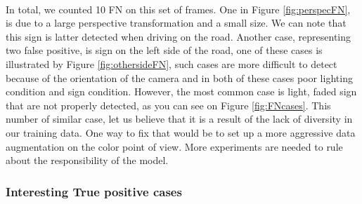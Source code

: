 \paragraph{}
In total, we counted 10 FN on this set of frames. One in Figure \ref{fig:perspecFN}, is due to a large perspective transformation and a small size. We can note that this sign is latter detected when driving on the road. Another case, representing two false positive, is sign on the left side of the road, one of these cases is illustrated by Figure \ref{fig:othersideFN}, such cases are more difficult to detect because of the orientation of the camera and in both of these cases poor lighting condition and sign condition. However, the most common case is light, faded sign that are not properly detected, as you can see on Figure \ref{fig:FNcases}. This number of similar case, let us believe that it is a result of the lack of diversity in our training data. One way to fix that would be to set up a more aggressive data augmentation on the color point of view. More experiments are needed to rule about the responsibility of the model.

\subsubsection{Interesting True positive cases}

